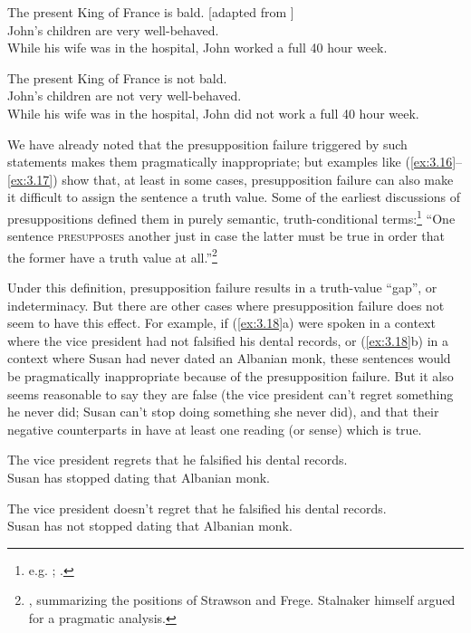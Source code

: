 \ea \label{ex:3.16}
\ea The present King of France is bald.  [adapted from \citet{Russell1905}]\\
\ex John’s children are very well-behaved.\\
\ex While his wife was in the hospital, John worked a full 40 hour week.
                       \z
\z

\ea \label{ex:3.17}
\ea The present King of France is not bald.\\
\ex John’s children are not very well-behaved.\\
\ex While his wife was in the hospital, John did not work a full 40 hour week.
                       \z
\z


We have already noted that the presupposition failure triggered by such statements makes them pragmatically inappropriate; but examples like (\ref{ex:3.16}--\ref{ex:3.17}) show that, at least in some cases, presupposition failure can also make it difficult to assign the sentence a truth value. Some of the earliest discussions of presuppositions defined them in purely semantic, truth-conditional terms:\footnote{e.g. \citet{Frege1892}; \citet{Strawson1950,Strawson1952}.} “One sentence \textsc{presupposes} another just in case the latter must be true in order that the former have a truth value at all.”\footnote{\citet[447]{Stalnaker1973}, summarizing the positions of Strawson and Frege. Stalnaker himself argued for a pragmatic analysis.}



Under this definition, presupposition failure results in a truth-value “gap”, or indeterminacy. But there are other cases where presupposition failure does not seem to have this effect. For example, if (\ref{ex:3.18}a) were spoken in a context where the vice president had not falsified his dental records, or (\ref{ex:3.18}b) in a context where Susan had never dated an Albanian monk, these sentences would be pragmatically inappropriate because of the presupposition failure. But it also seems reasonable to say they are false (the vice president can’t regret something he never did; Susan can’t stop doing something she never did), and that their negative counterparts in  have at least one reading (or sense) which is true. 


\ea \label{ex:3.18}
\ea The vice president regrets that he falsified his dental records.\\
\ex Susan has stopped dating that Albanian monk.
\z
                       \z

\ea \label{ex:3.19}
\ea The vice president doesn’t regret that he falsified his dental records.\\
\ex Susan has not stopped dating that Albanian monk.
                       \z
\z


